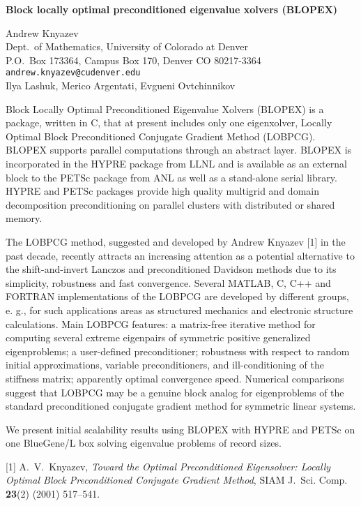 \documentclass{report}
\begin{document}

\begin{center}
{\large
{\bf Block locally optimal preconditioned eigenvalue xolvers (BLOPEX)}}

	Andrew Knyazev \\
	Dept.~of Mathematics, University of Colorado at Denver \\
	P.O.~Box 173364, Campus Box 170, Denver CO 80217-3364 \\
	{\tt andrew.knyazev@cudenver.edu} \\
	Ilya Lashuk, Merico Argentati, Evgueni Ovtchinnikov
\end{center}
Block Locally Optimal Preconditioned Eigenvalue Xolvers
(BLOPEX) is a package, written in C, that at present
includes only one eigenxolver, Locally Optimal Block
Preconditioned Conjugate Gradient Method (LOBPCG). BLOPEX
supports parallel computations through an abstract layer.
BLOPEX is incorporated in the HYPRE package from LLNL and is
available as an external block to the PETSc package from ANL
as well as a stand-alone serial library. HYPRE and PETSc
packages provide high quality multigrid and domain
decomposition preconditioning on parallel clusters with
distributed or shared memory.

 The LOBPCG method,
suggested and developed by Andrew Knyazev [1] in the past
decade, recently attracts an increasing attention as a
potential alternative to the shift-and-invert Lanczos and
preconditioned Davidson methods due to its simplicity,
robustness and fast convergence. Several MATLAB, C, C++ and
FORTRAN implementations of the LOBPCG are developed by
different groups, e. g., for such applications areas as
structured mechanics and electronic structure calculations.
Main LOBPCG features: a matrix-free iterative method for
computing several extreme eigenpairs of symmetric positive
generalized eigenproblems; a user-defined preconditioner;
robustness with respect to random initial approximations,
variable preconditioners, and ill-conditioning of the
stiffness matrix; apparently optimal convergence speed.
Numerical comparisons suggest that LOBPCG may be a genuine
block analog for eigenproblems of the standard
preconditioned conjugate gradient method for symmetric
linear systems.

We present initial scalability results
using BLOPEX with HYPRE and PETSc on one BlueGene/L box
solving eigenvalue problems of record sizes.

[1] A.~V.~Knyazev, {\em Toward the Optimal Preconditioned
Eigensolver: Locally Optimal Block Preconditioned Conjugate
Gradient Method}, SIAM J.~Sci. Comp. {\bf 23}(2) (2001)
517--541.



\end{document}
